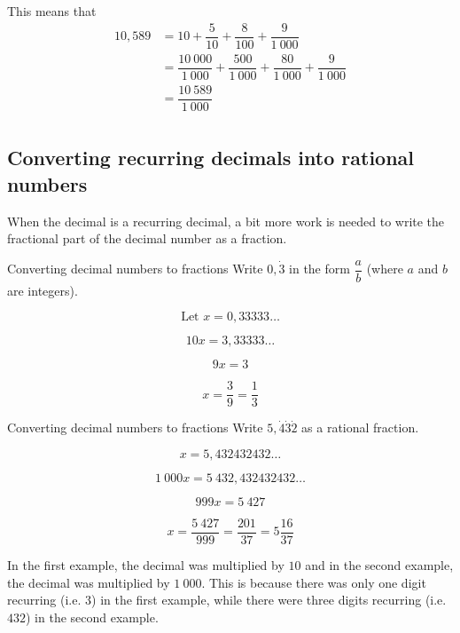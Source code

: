 This means that
\begin{align*}
  10,589 &= 10 + \dfrac{5}{10} + \dfrac{8}{100} + \dfrac{9}{1~000} \\
  &= \dfrac{10~000}{1~000} + \dfrac{500}{1~000} + \dfrac{80}{1~000} + \dfrac{9}{1~000} \\
  &= \dfrac{10~589}{1~000} \\
\end{align*}

\subsection{Converting recurring decimals into rational numbers}


When the decimal is a recurring decimal, a bit more work is needed to write the fractional part of the decimal number as a fraction.\par 

\begin{wex}
{%
Converting decimal numbers to fractions
}
{%
Write $0,\dot{3}$ in the form $\dfrac{a}{b}$ (where $a$ and $b$ are integers).
}
{%

$$\mbox{Let } x = 0,33333\ldots$$

$$10x = 3,33333\ldots$$

$$9x = 3 $$

$$ x = \dfrac{3}{9} = \dfrac{1}{3} $$
}
\end{wex}


\begin{wex}
{%
Converting decimal numbers to fractions
}
{%
Write $5,\dot{4}\dot{3}\dot{2}$ as a rational fraction.
}
{%

$$ x = 5,432432432\ldots $$

$$ 1~000x = 5~432,432432432\ldots $$

$$ 999x = 5~427 $$

$$ x = \dfrac{5~427}{999} = \dfrac{201}{37} = 5\dfrac{16}{37}$$
}
\end{wex}

In the first example, the decimal was multiplied by $10$ and in the
second example, the decimal was multiplied by $1~000$. This is because
there was only one digit recurring (i.e. $3$) in the first example,
while there were three digits recurring (i.e. $432$) in the second
example.\par 

